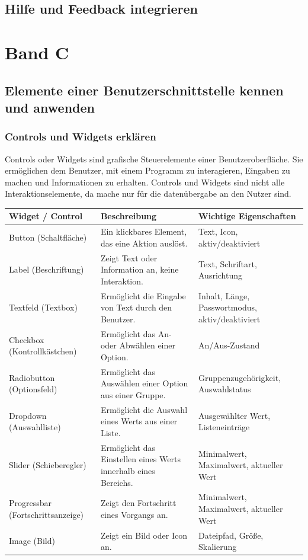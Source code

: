 \documentclass[10pt]{article}
\newcounter{subsubsubsection}[subsubsection]
\begin{document}
	\subsection{Hilfe und Feedback integrieren}
	
	
	
	\section{Band C}
	\subsection{Elemente einer Benutzerschnittstelle kennen und anwenden}
	\subsubsection{Controls und Widgets erklären}
	Controls oder Widgets sind grafische Steuerelemente einer Benutzeroberfläche. Sie ermöglichen dem Benutzer, mit einem Programm zu interagieren, Eingaben zu machen und Informationen zu erhalten. Controls und Widgets sind nicht alle Interaktionselemente, da mache nur für die datenübergabe an den Nutzer sind.
	
	\begin{tabular}{@{}lll@{}}
		\toprule
		\textbf{Widget / Control} & \textbf{Beschreibung} & \textbf{Wichtige Eigenschaften} \\
		\midrule
		Button (Schaltfläche) & Ein klickbares Element, das eine Aktion auslöst. & Text, Icon, aktiv/deaktiviert \\
		Label (Beschriftung) & Zeigt Text oder Information an, keine Interaktion. & Text, Schriftart, Ausrichtung \\
		Textfeld (Textbox) & Ermöglicht die Eingabe von Text durch den Benutzer. & Inhalt, Länge, Passwortmodus, aktiv/deaktiviert \\
		Checkbox (Kontrollkästchen) & Ermöglicht das An- oder Abwählen einer Option. & An/Aus-Zustand \\
		Radiobutton (Optionsfeld) & Ermöglicht das Auswählen einer Option aus einer Gruppe. & Gruppenzugehörigkeit, Auswahlstatus \\
		Dropdown (Auswahlliste) & Ermöglicht die Auswahl eines Werts aus einer Liste. & Ausgewählter Wert, Listeneinträge \\
		Slider (Schieberegler) & Ermöglicht das Einstellen eines Werts innerhalb eines Bereichs. & Minimalwert, Maximalwert, aktueller Wert \\
		Progressbar (Fortschrittsanzeige) & Zeigt den Fortschritt eines Vorgangs an. & Minimalwert, Maximalwert, aktueller Wert \\
		Image (Bild) & Zeigt ein Bild oder Icon an. & Dateipfad, Größe, Skalierung \\
		\bottomrule
	\end{tabular}
	
	
\end{document}
